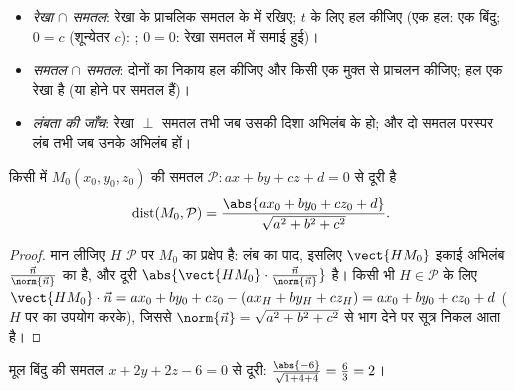 \begin{method}[व्यवहार में प्रतिच्छेद]\label{met:g12:space:intersections}
\begin{itemize}
  \item \emph{रेखा $\cap$ समतल}: रेखा के प्राचलिक  समतल के 
        में रखिए; $t$ के लिए हल कीजिए (एक हल: एक बिंदु; $0 = c$ (शून्येतर $c$):
        ; $0 = 0$: रेखा समतल में समाई हुई)।
  \item \emph{समतल $\cap$ समतल}: दोनों  का निकाय हल कीजिए और किसी एक
        मुक्त  से प्राचलन कीजिए; हल एक रेखा है (या 
         होने पर समतल  हैं)।
  \item \emph{लंबता की जाँच}: रेखा $\perp$ समतल तभी जब उसकी दिशा अभिलंब के
         हो; और दो समतल परस्पर लंब तभी जब उनके अभिलंब  हों।
\end{itemize}
\end{method}

\begin{proposition}[बिंदु से समतल तक की दूरी]\label{prop:g12:space:distance}
किसी  में $M_0(x_0, y_0, z_0)$ की समतल $\mathcal P : ax + by + cz + d = 0$ से दूरी है
\[
\operatorname{dist}(M_0, \mathcal P)
= \frac{\abs{ax_0 + by_0 + cz_0 + d}}{\sqrt{a^2 + b^2 + c^2}}.
\]
\end{proposition}

\begin{proof}
मान लीजिए $H$ $\mathcal P$ पर $M_0$ का  प्रक्षेप है: लंब का पाद, इसलिए $\vect{HM_0}$
इकाई अभिलंब $\frac{\vec n}{\norm{\vec n}}$ का  है, और दूरी $\abs{\vect{HM_0}\cdot \frac{\vec n}{\norm{\vec n}}}$ है। किसी भी $H \in \mathcal P$ के लिए $\vect{HM_0}\cdot\vec n = ax_0 + by_0 + cz_0 - (ax_H + by_H + cz_H)
= ax_0 + by_0 + cz_0 + d$
($H$ पर  का उपयोग करके), जिससे $\norm{\vec n} = \sqrt{a^2+b^2+c^2}$ से भाग देने पर सूत्र निकल आता है।
\end{proof}

\begin{example}\label{ex:g12:space:distance}
मूल बिंदु की समतल $x + 2y + 2z - 6 = 0$ से दूरी: $\frac{\abs{-6}}{\sqrt{1 + 4 + 4}} = \frac63 = 2$।
\end{example}

